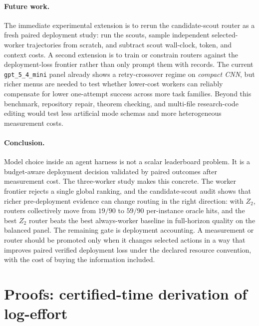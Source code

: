 \documentclass{article}
\begin{document}
\paragraph{Future work.}
The immediate experimental extension is to rerun the candidate-scout router as a fresh paired deployment study: run the scouts, sample independent selected-worker trajectories from scratch, and subtract scout wall-clock, token, and context costs.
A second extension is to train or constrain routers against the deployment-loss frontier rather than only prompt them with records.
The current \texttt{gpt\_5\_4\_mini} panel already shows a retry-crossover regime on \textit{compact CNN}, but richer menus are needed to test whether lower-cost workers can reliably compensate for lower one-attempt success across more task families.
Beyond this benchmark, repository repair, theorem checking, and multi-file research-code editing would test less artificial mode schemas and more heterogeneous measurement costs.

\paragraph{Conclusion.}
Model choice inside an agent harness is not a scalar leaderboard problem.
It is a budget-aware deployment decision validated by paired outcomes after measurement cost.
The three-worker study makes this concrete.
The worker frontier rejects a single global ranking, and the candidate-scout audit shows that richer pre-deployment evidence can change routing in the right direction: with \(Z_2\), routers collectively move from \(19/90\) to \(59/90\) per-instance oracle hits, and the best \(Z_2\) router beats the best always-worker baseline in full-horizon quality on the balanced panel.
The remaining gate is deployment accounting.
A measurement or router should be promoted only when it changes selected actions in a way that improves paired verified deployment loss under the declared resource convention, with the cost of buying the information included.

\clearpage



\clearpage

\appendix

\clearpage
\section{Proofs: certified-time derivation of log-effort}
\label{app:proofs}
\label{app:certified-log-effort}
\end{document}

